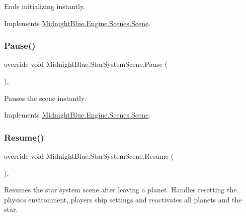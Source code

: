 Ends initializing instantly. 



Implements \hyperlink{class_midnight_blue_1_1_engine_1_1_scenes_1_1_scene_aa919101862c14384b955d91a4d3362ab}{Midnight\+Blue.\+Engine.\+Scenes.\+Scene}.

\hypertarget{class_midnight_blue_1_1_star_system_scene_a04e8bfcb31eebfd859c4bd543f0bb6f9}{}\label{class_midnight_blue_1_1_star_system_scene_a04e8bfcb31eebfd859c4bd543f0bb6f9} 
\subsubsection{\texorpdfstring{Pause()}{Pause()}}
{\footnotesize\ttfamily override void Midnight\+Blue.\+Star\+System\+Scene.\+Pause (\begin{DoxyParamCaption}{ }\end{DoxyParamCaption})\hspace{0.3cm}{\ttfamily [inline]}, {\ttfamily [virtual]}}



Pauses the scene instantly. 



Implements \hyperlink{class_midnight_blue_1_1_engine_1_1_scenes_1_1_scene_aeb3c4d9bea0177d21fbffcdabab660de}{Midnight\+Blue.\+Engine.\+Scenes.\+Scene}.

\hypertarget{class_midnight_blue_1_1_star_system_scene_aefbf0750a7ce153b923bcabb132e4875}{}\label{class_midnight_blue_1_1_star_system_scene_aefbf0750a7ce153b923bcabb132e4875} 
\subsubsection{\texorpdfstring{Resume()}{Resume()}}
{\footnotesize\ttfamily override void Midnight\+Blue.\+Star\+System\+Scene.\+Resume (\begin{DoxyParamCaption}{ }\end{DoxyParamCaption})\hspace{0.3cm}{\ttfamily [inline]}, {\ttfamily [virtual]}}



Resumes the star system scene after leaving a planet. Handles resetting the physics environment, players ship settings and reactivates all planets and the star. 



